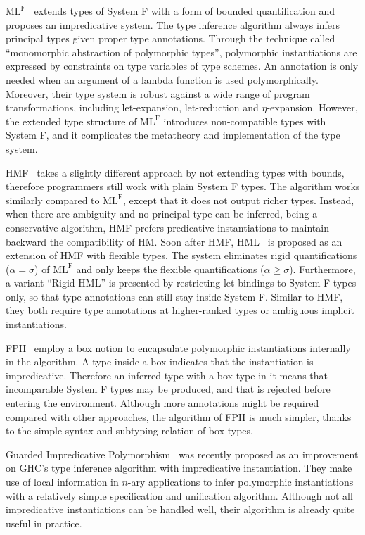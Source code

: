 $\text{ML}^\text{F}$~\citep{le2003ml,remy2008from,Botlan2009recasting}
extends types of System F with a form of bounded quantification
and proposes an impredicative system.
The type inference algorithm always infers principal types given proper type annotations.
Through the technique called ``monomorphic abstraction of polymorphic types'',
polymorphic instantiations are expressed by constraints
on type variables of type schemes.
An annotation is only needed when an argument of a lambda function
is used polymorphically.
Moreover, their type system is robust against a wide range of program transformations,
including let-expansion, let-reduction and $\eta$-expansion.
However, the extended type structure of $\text{ML}^\text{F}$
introduces non-compatible types with System F,
and it complicates the metatheory and implementation of the type system.

HMF~\citep{leijen2008hmf} takes a slightly different approach
by not extending types with bounds,
therefore programmers still work with plain System F types.
The algorithm works similarly compared to $\text{ML}^\text{F}$,
except that it does not output richer types.
Instead, when there are ambiguity and no principal type can be inferred,
being a conservative algorithm,
HMF prefers predicative instantiations
to maintain backward the compatibility of HM.
Soon after HMF, HML~\citep{leijen2009flexible} is proposed as
an extension of HMF with flexible types.
The system eliminates rigid quantifications ($\alpha = \sigma$)
of $\text{ML}^\text{F}$ and only keeps the flexible quantifications ($\alpha \ge \sigma$).
Furthermore, a variant ``Rigid HML'' is presented
by restricting let-bindings to System F types only,
so that type annotations can still stay inside System F.
Similar to HMF, they both require type annotations at higher-ranked
types or ambiguous implicit instantiations.

FPH~\citep{vytiniotis2008fph} employ a box notion \framebox{$\sigma$} to
encapsulate polymorphic instantiations internally in the algorithm.
A type inside a box indicates that the instantiation is impredicative.
Therefore an inferred type with a box type in it means that
incomparable System F types may be produced,
and that is rejected before entering the environment.
Although more annotations might be required compared with other approaches,
the algorithm of FPH is much simpler,
thanks to the simple syntax and subtyping relation of box types.


Guarded Impredicative Polymorphism~\citep{Serrano2018} was recently proposed
as an improvement on GHC's type inference algorithm with impredicative instantiation.
They make use of local information in $n$-ary applications to
infer polymorphic instantiations with a relatively simple specification and unification algorithm.
Although not all impredicative instantiations can be handled well,
their algorithm is already quite useful in practice.

